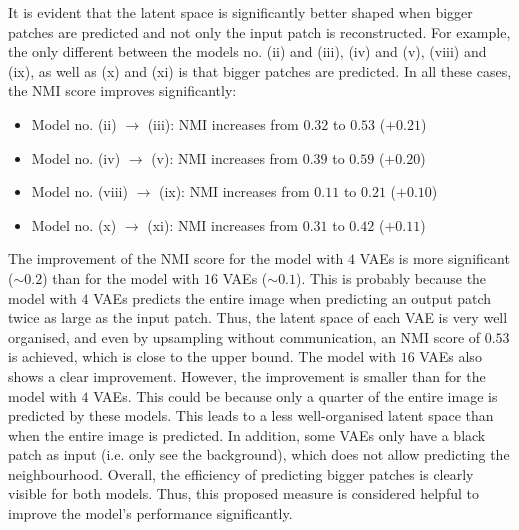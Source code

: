 It is evident that the latent space is significantly better shaped when bigger patches are predicted and not only the input patch is reconstructed. For example, the only different between the models no. (ii) and (iii), (iv) and (v), (viii) and (ix), as well as (x) and (xi) is that bigger patches are predicted. In all these cases, the NMI score improves significantly: 
\begin{itemize}
	\item Model no. (ii) $\rightarrow$ (iii): NMI increases from $0.32$ to $0.53$ ($+0.21$)
	\item Model no. (iv) $\rightarrow$ (v): NMI increases from $0.39$ to $0.59$ ($+0.20$)
	\item Model no. (viii) $\rightarrow$ (ix): NMI increases from $0.11$ to $0.21$ ($+0.10$)
	\item Model no. (x) $\rightarrow$ (xi): NMI increases from $0.31$ to $0.42$ ($+0.11$)
\end{itemize}

The improvement of the NMI score for the model with $4$ VAEs is more significant ($\sim 0.2$) than for the model with $16$ VAEs ($\sim 0.1$). This is probably because the model with $4$ VAEs predicts the entire image when predicting an output patch twice as large as the input patch. Thus, the latent space of each VAE is very well organised, and even by upsampling without communication, an NMI score of $0.53$ is achieved, which is close to the upper bound. The model with $16$ VAEs also shows a clear improvement. However, the improvement is smaller than for the model with $4$ VAEs. This could be because only a quarter of the entire image is predicted by these models. This leads to a less well-organised latent space than when the entire image is predicted. In addition, some VAEs only have a black patch as input (i.e. only see the background), which does not allow predicting the neighbourhood.
Overall, the efficiency of predicting bigger patches is clearly visible for both models. Thus, this proposed measure is considered helpful to improve the model's performance significantly.

